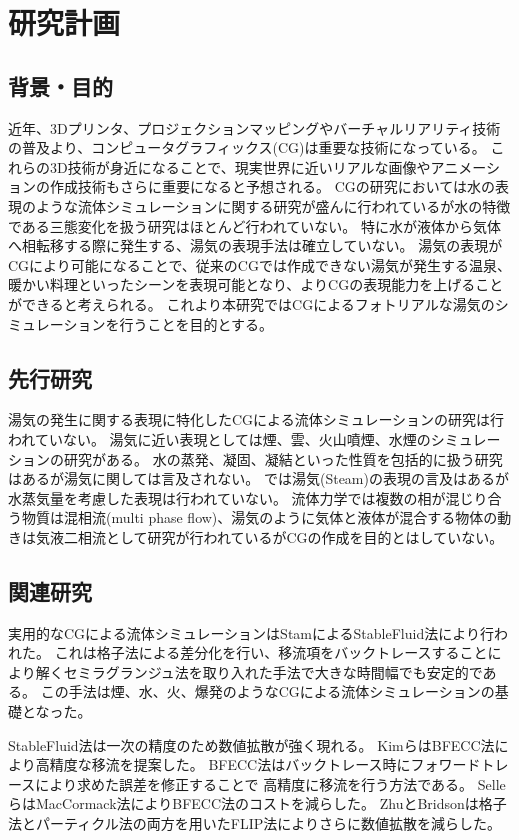 \section{研究計画}
\subsection{背景・目的}
近年、3Dプリンタ、プロジェクションマッピングやバーチャルリアリティ技術の普及より、コンピュータグラフィックス(CG)は重要な技術になっている。
これらの3D技術が身近になることで、現実世界に近いリアルな画像やアニメーションの作成技術もさらに重要になると予想される。 CGの研究においては水の表現のような流体シミュレーションに関する研究が盛んに行われているが水の特徴である三態変化を扱う研究はほとんど行われていない。
特に水が液体から気体へ相転移する際に発生する、湯気の表現手法は確立していない。
湯気の表現がCGにより可能になることで、従来のCGでは作成できない湯気が発生する温泉、暖かい料理といったシーンを表現可能となり、よりCGの表現能力を上げることができると考えられる。
これより本研究ではCGによるフォトリアルな湯気のシミュレーションを行うことを目的とする。
\subsection{先行研究}
湯気の発生に関する表現に特化したCGによる流体シミュレーションの研究は行われていない。
湯気に近い表現としては煙\cite{Fedkiw2001}、雲\cite{Dobashi2000}\cite{Miyazaki2001}\cite{Miyazaki2002}、火山噴煙\cite{Mizuno2003}\cite{Mizuno2004}、水煙\cite{Nielsen2013}のシミュレーションの研究がある。
水の蒸発、凝固、凝結といった性質を包括的に扱う研究\cite{Fujisawa2008}はあるが湯気に関しては言及されない。
\cite{Foster1997}では湯気(Steam)の表現の言及はあるが水蒸気量を考慮した表現は行われていない。
流体力学では複数の相が混じり合う物質は混相流(multi phase flow)、湯気のように気体と液体が混合する物体の動きは気液二相流として研究が行われているがCGの作成を目的とはしていない。

\subsection{関連研究}
実用的なCGによる流体シミュレーションはStamによるStableFluid法\cite{Stam1999}により行われた。
これは格子法による差分化を行い、移流項をバックトレースすることにより解くセミラグランジュ法を取り入れた手法で大きな時間幅でも安定的である。
この手法は煙\cite{Fedkiw2001}、水\cite{Foster2001}、火\cite{Nguyen2002}、爆発\cite{Feldman2003}のようなCGによる流体シミュレーションの基礎となった。

StableFluid法は一次の精度のため数値拡散が強く現れる。
Kimら\cite{Kim2005}はBFECC法により高精度な移流を提案した。
BFECC法はバックトレース時にフォワードトレースにより求めた誤差を修正することで	高精度に移流を行う方法である。
Selleら\cite{Selle2008}はMacCormack法によりBFECC法のコストを減らした。
ZhuとBridson\cite{Zhu2005}は格子法とパーティクル法の両方を用いたFLIP法によりさらに数値拡散を減らした。

